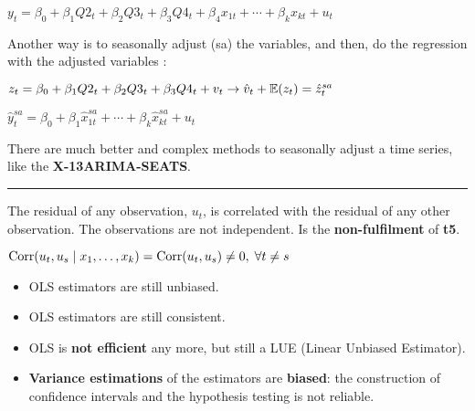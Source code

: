 \begin{f}[Seasonality]
\begin{center}
	$y_{t} = \beta_{0} + \beta_{1} Q2_{t} + \beta_{2} Q3_{t} + \beta_{3} Q4_{t} + \beta_{4} x_{1t} + \cdots + \beta_{k} x_{kt} + u_{t}$
\end{center}

Another way is to seasonally adjust (sa) the variables, and then, do the regression with the adjusted variables :

\begin{center}
	$z_{t} = \beta_{0} + \beta_{1} Q2_{t} + \beta_{2} Q3_{t} + \beta_{3} Q4_{t} + v_{t} \rightarrow \hat{v}_{t} + \mathbb{E}(z_{t}) = \hat{z}_{t}^{sa}$
	
	$\hat{y}_{t}^{sa}= \beta_{0} + \beta_{1} \hat{x}_{1t}^{sa} + \cdots + \beta_{k} \hat{x}_{kt}^{sa} + u_{t}$
\end{center}

There are much better and complex methods to seasonally adjust a time series, like the \textbf{X-13ARIMA-SEATS}.

\end{f}  \hrule

\begin{f}[Autocorrelation]

The residual of any observation, $u_{t}$, is correlated with the residual of any other observation. The observations are not independent. Is the \textbf{non-fulfilment} of \textbf{t5}.

\begin{center}
	$\mathrm{Corr}(u_{t}, u_{s} \mid x_{1}, \ldots, x_{k}) = \mathrm{Corr}(u_{t}, u_{s}) \neq 0, \; \forall t \neq s$
\end{center}

\end{f}    
\begin{f}[Consequences]

\begin{itemize}[leftmargin=*]
	\item OLS estimators are still unbiased.
	\item OLS estimators are still consistent.
	\item OLS is \textbf{not efficient} any more, but still a LUE (Linear Unbiased Estimator).
	\item \textbf{Variance estimations} of the estimators are \textbf{biased}: the construction of confidence intervals and the hypothesis testing is not reliable.
\end{itemize}

\end{f}    

